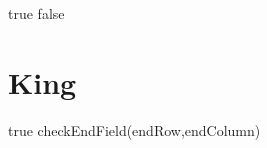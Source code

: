 \begin{algorithmic}
    \State \Return true
\EndIf
 \State \Return false
\end{algorithmic}

\section{King}

\begin{algorithmic}
    \State \Return true
\EndIf
\State \Return checkEndField(endRow,endColumn)
\end{algorithmic}




